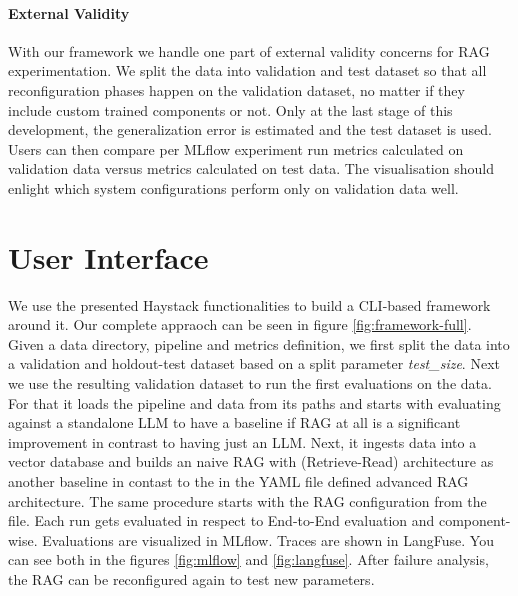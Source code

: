 \paragraph{External Validity}

With our framework we handle one part of external validity concerns for RAG experimentation. We split the data into validation and test dataset so that all reconfiguration phases happen on the validation dataset, no matter if they include custom trained components or not. Only at the last stage of this development, the generalization error is estimated and the test dataset is used. Users can then compare per MLflow experiment run metrics calculated on validation data versus metrics calculated on test data. The visualisation should enlight which system configurations perform only on validation data well. 

\section{User Interface}

We use the presented Haystack functionalities to build a CLI-based framework around it. Our complete appraoch can be seen in figure \ref{fig:framework-full}. Given a data directory, pipeline and metrics definition, we first split the data into a validation and holdout-test dataset based on a split parameter \textit{test\_size}. Next we use the resulting validation dataset to run the first evaluations on the data. For that it loads the pipeline and data from its paths and starts with evaluating against a standalone LLM to have a baseline if RAG at all is a significant improvement in contrast to having just an LLM. Next, it ingests data into a vector database and builds an naive RAG with (Retrieve-Read) architecture as another baseline in contast to the in the YAML file defined advanced RAG architecture. The same procedure starts with the RAG configuration from the file. Each run gets evaluated in respect to End-to-End evaluation and component-wise. Evaluations are visualized in MLflow. Traces are shown in LangFuse. You can see both in the figures \ref{fig:mlflow} and \ref{fig:langfuse}. After failure analysis, the RAG can be reconfigured again to test new parameters. 


